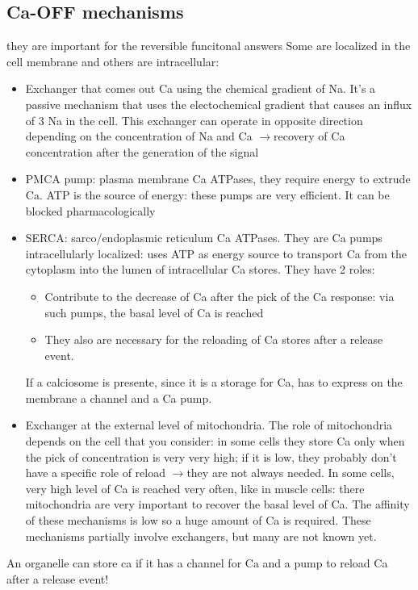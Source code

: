\documentclass[a4paper, 12pt]{book}
\newcommand{\lfreccia}{\ensuremath{\longrightarrow}}
\begin{document}
\subsection{Ca-OFF mechanisms}
they are important for the reversible funcitonal answers
Some are localized in the cell membrane and others are intracellular:
\begin{itemize}
\item{Exchanger that comes out Ca using the chemical gradient of Na. It's a passive mechanism that uses the electochemical gradient that causes an influx of 3 Na in the cell. This exchanger can operate in opposite direction depending on the concentration of Na and Ca \lfreccia recovery of Ca concentration after the generation of the signal}
\item{PMCA pump: plasma membrane Ca ATPases, they require energy to extrude Ca. ATP is the source of energy: these pumps are very efficient. It can be blocked pharmacologically}
\item{SERCA: sarco/endoplasmic reticulum Ca ATPases. They are Ca pumps intracellularly localized: uses ATP as energy source to transport Ca from the cytoplasm into the lumen of intracellular Ca stores. They have 2 roles:
\begin{itemize}
\item{Contribute to the decrease of Ca after the pick of the Ca response: via such pumps, the basal level of Ca is reached}
\item{They also are necessary for the reloading of Ca stores after a release event.}
\end{itemize}
If a calciosome is presente, since it is a storage for Ca, has to express on the membrane a channel and a Ca pump.}
\item{Exchanger at the external level of mitochondria. The role of mitochondria depends on the cell that you consider: in some cells they store Ca only when the pick of concentration is very very high; if it is low, they probably don't have a specific role of reload \lfreccia they are not always needed. In some cells, very high level of Ca is reached very often, like in muscle cells: there mitochondria are very important to recover the basal level of Ca. The affinity of these mechanisms is low so a huge amount of Ca is required. These mechanisms partially involve exchangers, but many are not known yet.}
\end{itemize}

An organelle can store ca if it has a channel for Ca and a pump to reload Ca after a release event!
\end{document}
